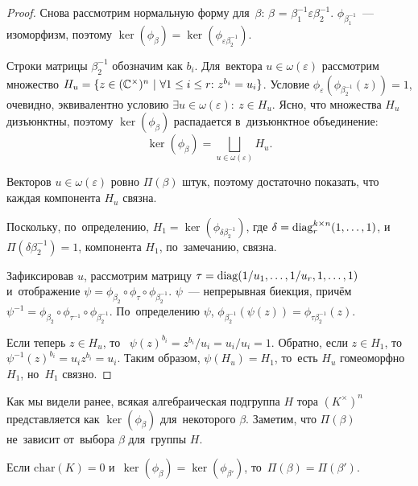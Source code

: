 \documentclass[a4paper,oneside]{article}
\begin{document}
\begin{proof}
  Снова рассмотрим нормальную форму для~$\beta$: $\beta$ = $\beta_1^{-1} \varepsilon \beta_2^{-1}$.
  $\phi_{\beta_1^{-1}}$~— изоморфизм, поэтому $\ker(\phi_{\beta}) = \ker(\phi_{\varepsilon \beta_2^{-1}})$.

  Строки матрицы $\beta_2^{-1}$ обозначим как $b_i$.
  Для~вектора $u \in \omega(\varepsilon)$ рассмотрим множество $H_u = \{z \in (\mathbb{C}^\times)^n \ | \ \forall 1 \leq i \leq r{:}\ z^{b_i} = u_i\}$.
  Условие $\phi_\varepsilon(\phi_{\beta_2^{-1}}(z)) = 1$, очевидно, эквивалентно условию $\exists u \in \omega(\varepsilon){:}\ z \in H_u$.
  Ясно, что множества $H_u$ дизъюнктны, поэтому $\ker(\phi_{\beta})$ распадается в~дизъюнктное объединение:
  \[
    \ker(\phi_{\beta}) = \bigsqcup_{u \in \omega(\varepsilon)} H_u.
  \]

  Векторов $u \in \omega(\varepsilon)$ ровно $\Pi(\beta)$ штук, поэтому достаточно показать, что каждая компонента $H_u$ связна.

  Поскольку, по~определению, $H_1 = \ker(\phi_{\delta \beta_2^{-1}})$, где $\delta = \mathrm{diag}^{k \times n}_r(1, \ldots, 1)$,
  и~$\Pi(\delta \beta_2^{-1}) = 1$, компонента $H_1$, по~замечанию, связна.

  Зафиксировав $u$, рассмотрим матрицу $\tau = \mathrm{diag}(1 / u_1, \ldots, 1 / u_r, 1, \ldots, 1)$ и~отображение $\psi = \phi_{\beta_2} \circ \phi_\tau \circ \phi_{\beta_2^{-1}}$.
  $\psi$~— непрерывная биекция, причём $\psi^{-1} = \phi_{\beta_2} \circ \phi_{\tau^{-1}} \circ \phi_{\beta_2^{-1}}$.
  По~определению $\psi$, $\phi_{\beta_2^{-1}}(\psi(z)) = \phi_{\tau \beta_2^{-1}}(z)$.

  Если теперь $z \in H_u$, то~ $\psi(z)^{b_i} = z^{b_i} / u_i = u_i / u_i = 1$. Обратно, если $z \in H_1$,
  то~$\psi^{-1}(z)^{b_i} = u_i z^{b_i} = u_i$. Таким образом, $\psi(H_u) = H_1$,
  то~есть $H_u$ гомеоморфно $H_1$, но~$H_1$ связно.
\end{proof}

Как мы видели ранее, всякая алгебраическая подгруппа $H$ тора $(K^\times)^n$ представляется как $\ker(\phi_\beta)$
для~некоторого $\beta$. Заметим, что $\Pi(\beta)$ не~зависит от~выбора $\beta$ для~группы $H$.

\begin{theorem}
  Если $\mathrm{char}(K) = 0$ и~$\ker(\phi_{\beta}) = \ker(\phi_{\beta'})$, то~$\Pi(\beta) = \Pi(\beta')$.
\end{theorem}
\end{document}

